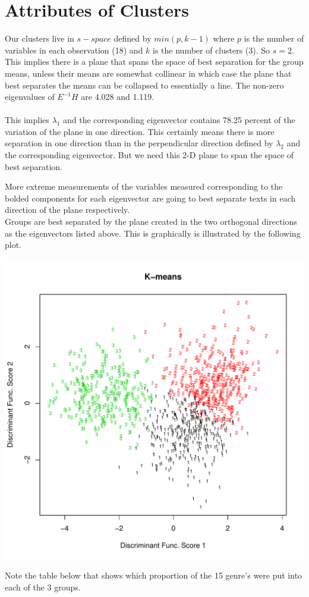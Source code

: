 \documentclass[11pt]{article}
\begin{document}
\section*{Attributes of Clusters}
Our clusters live in $s-space$ defined by $min(p,k-1)$ where $p$ is the number
of variables in each observation (18) and $k$ is the number of clusters (3). So
$s=2$. This implies there is a plane that spans the space of best separation for
the group means, unless their means are somewhat collinear in which case the
plane that best separates the means can be collapsed to essentially a line. The
non-zero eigenvalues of $E^{-1}H$ are 4.028 and 1.119. 
\\
\\
This implies $\lambda_1$ and the corresponding eigenvector contains 78.25 percent
of the variation of the plane in one direction. This certainly means there is
more separation in one direction than in the perpendicular direction defined by
$\lambda_2$ and the corresponding eigenvector. But we need this 2-D plane to span 
the space of best separation.



\noindent  More extreme measurements of the variables measured corresponding to
the bolded components for each eigenvector are going to best separate texts in
each direction of the plane respectively. 
\\
\newpage
\noindent Groups are best separated by the plane created in the two orthogonal
directions as the eigenvectors listed above. This is graphically is illustrated
by the following plot.

\begin{center}
\includegraphics[width=.5\textwidth]{disc.pdf}
\end{center}

\noindent Note the table below that shows which proportion of the 15 genre's
were put into each of the 3 groups. 
\end{document}

